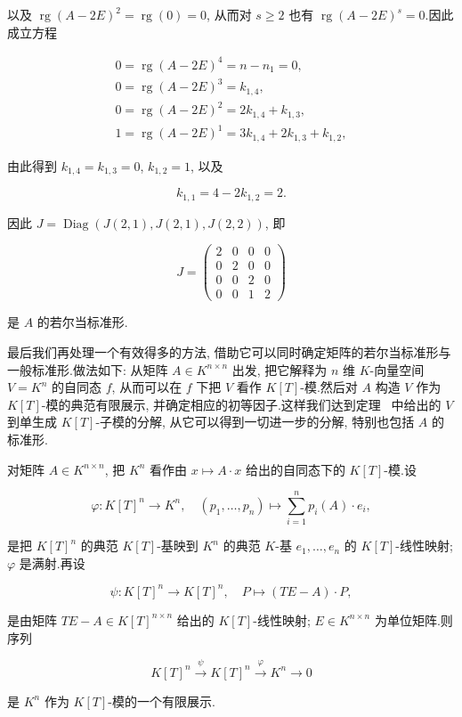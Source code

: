 以及 $\operatorname{rg}(A - 2E)^2 = \operatorname{rg}(0) = 0$, 从而对 $s \geq 2$ 也有 $\operatorname{rg}(A - 2E)^s = 0$.因此成立方程

\[
\begin{array}{l}
0 = \operatorname{rg}(A - 2E)^4 = n - n_1 = 0, \\
0 = \operatorname{rg}(A - 2E)^3 = k_{1, 4}, \\
0 = \operatorname{rg}(A - 2E)^2 = 2 k_{1, 4} + k_{1, 3}, \\
1 = \operatorname{rg}(A - 2E)^1 = 3 k_{1, 4} + 2 k_{1, 3} + k_{1, 2},
\end{array}\]

由此得到 $k_{1, 4} = k_{1, 3} = 0$, $k_{1, 2} = 1$, 以及

\[
k_{1, 1} = 4 - 2 k_{1, 2} = 2\text{.}\]

因此 $J = \operatorname{Diag}(J(2, 1), J(2, 1), J(2, 2))$, 即

\[
J = \left(\begin{array}{cccc} 2 & 0 & 0 & 0 \\ 0 & 2 & 0 & 0 \\ 0 & 0 & 2 & 0 \\ 0 & 0 & 1 & 2 \end{array}\right)\]

是 $A$ 的若尔当标准形.

最后我们再处理一个有效得多的方法, 借助它可以同时确定矩阵的若尔当标准形与一般标准形.做法如下: 从矩阵 $A \in K^{n \times n}$ 出发, 把它解释为 $n$ 维 $K$-向量空间 $V = K^n$ 的自同态 $f$, 从而可以在 $f$ 下把 $V$ 看作 $K[T]$-模.然后对 $A$ 构造 $V$ 作为 $K[T]$-模的典范有限展示, 并确定相应的初等因子.这样我们达到定理~ 中给出的 $V$ 到单生成 $K[T]$-子模的分解, 从它可以得到一切进一步的分解, 特别也包括 $A$ 的标准形.

\begin{lemma}\label{lem:6.5.17}
对矩阵 $A \in K^{n \times n}$, 把 $K^n$ 看作由 $x \longmapsto A \cdot x$ 给出的自同态下的 $K[T]$-模.设

\[
\varphi \colon K[T]^n \longrightarrow K^n, \quad (p_1, \ldots, p_n) \longmapsto \sum_{i = 1}^{n} p_i(A) \cdot e_i,\]

是把 $K[T]^n$ 的典范 $K[T]$-基映到 $K^n$ 的典范 $K$-基 $e_1, \ldots, e_n$ 的 $K[T]$-线性映射; $\varphi$ 是满射.再设

\[
\psi \colon K[T]^n \longrightarrow K[T]^n, \quad P \longmapsto (TE - A) \cdot P,\]

是由矩阵 $TE - A \in K[T]^{n \times n}$ 给出的 $K[T]$-线性映射; $E \in K^{n \times n}$ 为单位矩阵.则序列

\[
K[T]^n \xrightarrow{\psi} K[T]^n \xrightarrow{\varphi} K^n \longrightarrow 0\]

是 $K^n$ 作为 $K[T]$-模的一个有限展示.
\end{lemma}


